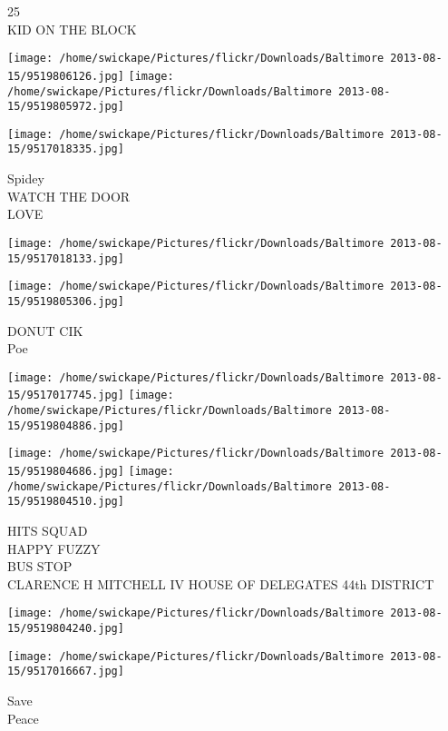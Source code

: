 \documentclass[10pt,letterpaper]{article}
\begin{document}
25\\
KID ON THE BLOCK\\
\pagebreak

\texttt{[image: /home/swickape/Pictures/flickr/Downloads/Baltimore 2013-08-15/9519806126.jpg]}
\texttt{[image: /home/swickape/Pictures/flickr/Downloads/Baltimore 2013-08-15/9519805972.jpg]}

\vspace{0.25in}
\texttt{[image: /home/swickape/Pictures/flickr/Downloads/Baltimore 2013-08-15/9517018335.jpg]}

Spidey\\
WATCH THE DOOR\\
LOVE\\
\pagebreak

\texttt{[image: /home/swickape/Pictures/flickr/Downloads/Baltimore 2013-08-15/9517018133.jpg]}

\vspace{0.25in}
\texttt{[image: /home/swickape/Pictures/flickr/Downloads/Baltimore 2013-08-15/9519805306.jpg]}

DONUT CIK\\
Poe\\
\pagebreak

\texttt{[image: /home/swickape/Pictures/flickr/Downloads/Baltimore 2013-08-15/9517017745.jpg]}
\texttt{[image: /home/swickape/Pictures/flickr/Downloads/Baltimore 2013-08-15/9519804886.jpg]}

\texttt{[image: /home/swickape/Pictures/flickr/Downloads/Baltimore 2013-08-15/9519804686.jpg]}
\texttt{[image: /home/swickape/Pictures/flickr/Downloads/Baltimore 2013-08-15/9519804510.jpg]}

HITS SQUAD\\
HAPPY FUZZY\\
BUS STOP\\
CLARENCE H MITCHELL IV HOUSE OF DELEGATES 44th DISTRICT\\
\pagebreak

\texttt{[image: /home/swickape/Pictures/flickr/Downloads/Baltimore 2013-08-15/9519804240.jpg]}

\vspace{0.25in}
\texttt{[image: /home/swickape/Pictures/flickr/Downloads/Baltimore 2013-08-15/9517016667.jpg]}

Save\\
Peace\\
\pagebreak
\end{document}
